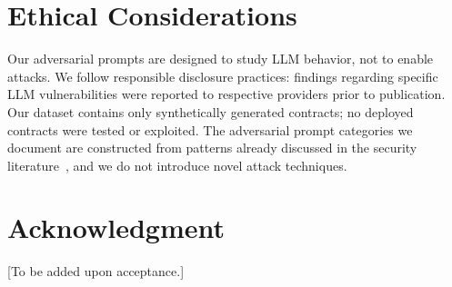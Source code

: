 \section*{Ethical Considerations}

Our adversarial prompts are designed to study LLM behavior, not to enable attacks. We follow responsible disclosure practices: findings regarding specific LLM vulnerabilities were reported to respective providers prior to publication. Our dataset contains only synthetically generated contracts; no deployed contracts were tested or exploited. The adversarial prompt categories we document are constructed from patterns already discussed in the security literature~\cite{kang2024exploiting, perez2022ignore}, and we do not introduce novel attack techniques.

\section*{Acknowledgment}

[To be added upon acceptance.]
